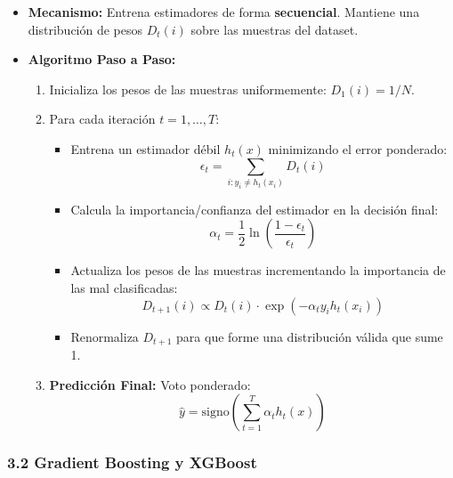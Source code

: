 \begin{itemize}
	\item \textbf{Mecanismo:} Entrena estimadores de forma \textbf{secuencial}. Mantiene una distribución de pesos $D_t(i)$ sobre las muestras del dataset.
	
	\item \textbf{Algoritmo Paso a Paso:}
	\begin{enumerate}
		\item Inicializa los pesos de las muestras uniformemente: $D_1(i) = 1/N$.
		\item Para cada iteración $t = 1, \dots, T$:
		\begin{itemize}
			\item Entrena un estimador débil $h_t(x)$ minimizando el error ponderado:
			$$\epsilon_t = \sum_{i: y_i \neq h_t(x_i)} D_t(i)$$
			\item Calcula la importancia/confianza del estimador en la decisión final:
			$$\alpha_t = \frac{1}{2} \ln\left(\frac{1 - \epsilon_t}{\epsilon_t}\right)$$
			\item Actualiza los pesos de las muestras incrementando la importancia de las mal clasificadas:
			$$D_{t+1}(i) \propto D_t(i) \cdot \exp\left(-\alpha_t y_i h_t(x_i)\right)$$
			\item Renormaliza $D_{t+1}$ para que forme una distribución válida que sume 1.
		\end{itemize}
		\item \textbf{Predicción Final:} Voto ponderado:
		$$\hat{y} = \text{signo}\left(\sum_{t=1}^{T} \alpha_t h_t(x)\right)$$
	\end{enumerate}
\end{itemize}

\subsubsection{3.2 Gradient Boosting y XGBoost}


